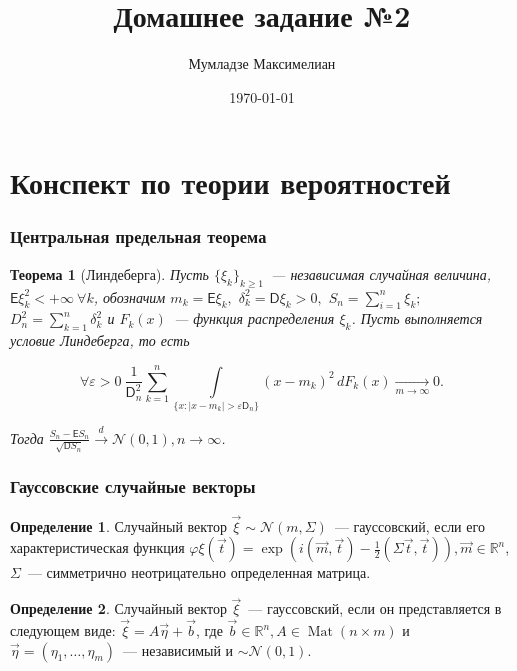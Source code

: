 \documentclass[11pt]{article}
\author{Мумладзе Максимелиан}
\title{Домашнее задание №2}
\date{\today}
\DeclareMathOperator{\mat}{Mat}
\newtheorem{thm}{Теорема}[section]
\theoremstyle{definition}\newtheorem{defi}{Определение}
\begin{document}
\maketitle

\part{Конспект по теории вероятностей}

\section{Центральная предельная теорема}

\begin{thm}[Линдеберга]

Пусть $\{\xi_k\}_{k \geq 1}$~--- независимая случайная величина, $\mathsf{E} \xi_k^2 < +\infty ~ \forall k$, обозначим $m_k = \mathsf{E} \xi_k,$ $\delta_k^2 = \mathsf{D} \xi_k > 0,$ $S_n = \sum\limits_{i = 1}^n \xi_k;$ $D_n^2 = \sum\limits_{k = 1}^n \delta_k^2$ и $F_k(x)$~--- функция распределения $\xi_k$. Пусть выполняется условие Линдеберга, то есть

$$
\forall \varepsilon > 0 ~ \frac{1}{\mathsf{D}_n^2} \sum\limits_{k = 1}^n \int\limits_{\big\{x: |x - m_k| > \varepsilon \mathsf{D}_n\big\}} (x - m_k)^2\,dF_k(x) \xrightarrow[m \rightarrow \infty]{} 0.
$$

Тогда $\frac{S_n - \mathsf{E} S_n}{\sqrt{\mathsf{D} S_n}} \xrightarrow{d} \mathcal{N}(0, 1), n \rightarrow \infty$.

\end{thm}


\section{Гауссовские случайные векторы}

\begin{defi}

Случайный вектор $\vec \xi \sim \mathcal{N}(m, \Sigma)$~--- гауссовский, если его характеристическая функция $\varphi \xi(\vec t) = \exp(i(\vec m, \vec t) - \frac{1}{2} (\Sigma \vec t, \vec t)), \vec m \in \mathbb{R}^n$, $\Sigma$~--- симметрично неотрицательно определенная матрица.

\end{defi}

\begin{defi}

Случайный вектор $\vec \xi$~--- гауссовский, если он представляется в следующем виде: $\vec \xi = A \vec \eta + \vec b$, где $\vec b \in \mathbb{R}^n, A \in \mat(n \times m)$ и $\vec \eta = (\eta_1, \dots, \eta_m)$~--- независимый и $\sim \mathcal{N}(0, 1)$.

\end{defi}
\end{document}
